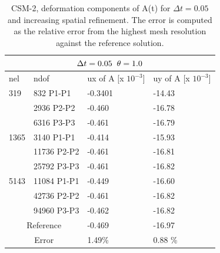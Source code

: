 \begin{table}[h!]
\centering
\begin{tabular}{ |p{1cm}||p{2.7cm}|p{3.3cm}|p{3.3cm}|}
\hline
  \multicolumn{4}{|c|}{$\Delta t = 0.05 \hspace{2mm} \theta = 1.0$} \\
\hline
nel & ndof & ux of A [x $10^{-3}$]  &uy of A [x $10^{-3}$] \\
\hline

 319     & 832 P1-P1  & -0.3401 &  -14.43  \\ 
     & 2936 P2-P2 &  -0.460  &  -16.78  \\ 
      & 6316 P3-P3 & -0.461 &  -16.79  \\
        \hline
  1365    & 3140 P1-P1  &  -0.414 &  -15.93\\
     & 11736 P2-P2 &  -0.461 &  -16.81 \\
     & 25792 P3-P3 & -0.461  &  -16.82 \\
        \hline
   5143    & 11084 P1-P1 & -0.449 &  -16.60  \\
     & 42736 P2-P2 &-0.461 &  -16.82 \\
     & 94960 P3-P3 & -0.462 &  -16.82 \\
  \hline
  \multicolumn{2}{|c|}{Reference}  & -0.469      & -16.97  \\
   \hline
    \multicolumn{2}{|c|}{Error}  & 1.49\%   & 0.88 \%\\
   \hline
\end{tabular}
\caption{CSM-2, deformation components of A(t) for $\Delta t = 0.05$ and increasing spatial refinement. The error is computed as the relative error from the highest mesh resolution against the reference solution.}
\label{table:csm2}
\end{table}

\newpage

